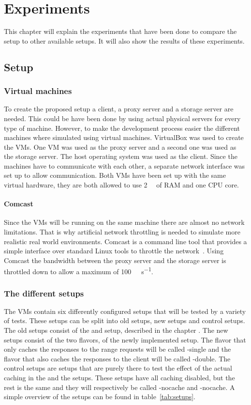 \documentclass[twoside,openright]{uva-bachelor-thesis}
\newcommand{\mbps}[1]{\SI[per-mode=symbol]{#1}{\mega\bit\per\second}}
\begin{document}
\chapter{Experiments}
This chapter will explain the experiments that have been done to compare the
\lt setup to other available setups. It will also show the results of these
experiments.

\section{Setup}

\subsection{Virtual machines}
To create the proposed setup a client, a proxy server and a storage server are
needed. This could be have been done by using actual physical servers for every
type of machine. However, to make the development process easier the different
machines where simulated using virtual machines. VirtualBox was used to create
the VMs. One VM was used as the proxy server and a second one was used as the
storage server. The host operating system was used as the client. Since the
machines have to communicate with each other, a separate network interface was
set up to allow communication. Both VMs have been set up with the same virtual
hardware, they are both allowed to use \SI{2}{\giga\byte} of RAM and one CPU
core.

\subsubsection{Comcast}
Since the VMs will be running on the same machine there are almost no network
limitations. That is why artificial network throttling is needed to simulate
more realistic real world environments. Comcast is a command line tool that
provides a simple interface over standard Linux tools to throttle the
network~\autocite{comcast}. Using Comcast the bandwidth between the proxy server
and the storage server is throttled down to allow a maximum of
\mbps{100}.


\subsection{The different setups}
The VMs contain six differently configured setups that will be tested by a
variety of tests.  These setups can be split into old setups, new setups and
control setups. The old setups consist of the \cdn and \ipp setup, described
in the chapter . The new setups consist of the two flavors,
of the newly implemented \ltlong setup. The flavor that only caches the responses
to the range requests will be called \lt-single and the flavor that also caches the
responses to the client will be called \lt-double. The control setups are setups
that are purely there to test the effect of the actual caching in the \lt and
the \cdn setups. These setups have all caching disabled, but the rest is the
same and they will respectively be called \lt-nocache and \cdn-nocache. A simple
overview of the setups can be found in table~\ref{tab:setups}.
\end{document}
